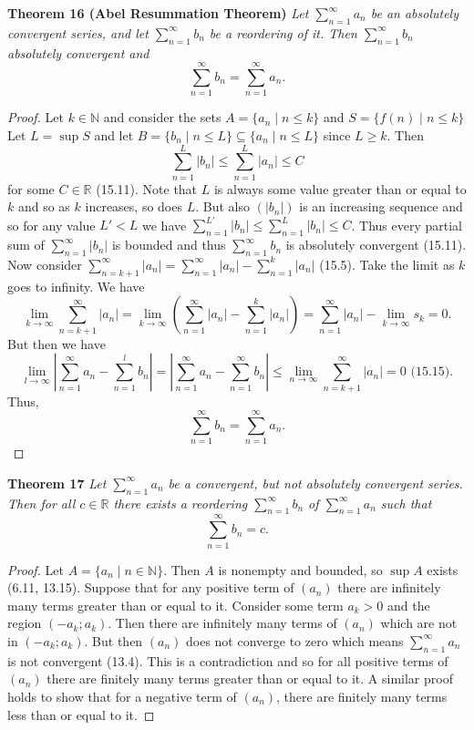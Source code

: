 \documentclass{article}
\begin{document}
\begin{flushleft}
\textbf{Theorem 16 (Abel Resummation Theorem)}
\textsl{Let $\sum_{n=1}^{\infty} a_n$ be an absolutely convergent series, and let $\sum_{n=1}^{\infty} b_n$ be a reordering of it. Then $\sum_{n=1}^{\infty} b_n$ absolutely convergent and
\[
\sum_{n=1}^{\infty} b_n = \sum_{n=1}^{\infty} a_n.
\]}
\begin{proof}
Let $k \in \mathbb{N}$ and consider the sets $A = \{a_n \mid n \leq k\}$ and $S = \{f(n) \mid n \leq k\}$ Let $L = \sup S$ and let $B = \{b_n \mid n \leq L\} \subseteq \{a_n \mid n \leq L\}$ since $L \geq k$. Then
\[
\sum_{n=1}^{L} |b_n| \leq \sum_{n=1}^{L} |a_n| \leq C
\]
for some $C \in \mathbb{R}$ (15.11). Note that $L$ is always some value greater than or equal to $k$ and so as $k$ increases, so does $L$. But also $(|b_n|)$ is an increasing sequence and so for any value $L' < L$ we have $\sum_{n=1}^{L'} |b_n| \leq \sum_{n=1}^L |b_n| \leq C$. Thus every partial sum of $\sum_{n=1}^{\infty} |b_n|$ is bounded and thus $\sum_{n=1}^{\infty} b_n$ is absolutely convergent (15.11). Now consider $\sum_{n=k+1}^{\infty} |a_n| = \sum_{n=1}^{\infty} |a_n| - \sum_{n=1}^{k} |a_n|$ (15.5). Take the limit as $k$ goes to infinity. We have
\[
\lim_{k \rightarrow \infty} \sum_{n=k+1}^{\infty} |a_n| = \lim_{k \rightarrow \infty} \left ( \sum_{n=1}^{\infty} |a_n| - \sum_{n=1}^{k} |a_n| \right ) = \sum_{n=1}^{\infty} |a_n| - \lim_{k \rightarrow \infty} s_k = 0.
\]
But then we have
\[
\lim_{l \rightarrow \infty} \left | \sum_{n=1}^{\infty} a_n - \sum_{n=1}^{l} b_n \right | = \left | \sum_{n=1}^{\infty} a_n - \sum_{n=1}^{\infty} b_n \right | \leq \lim_{n \rightarrow \infty} \sum_{n=k+1}^{\infty} |a_n| = 0 \text{ (15.15)}.
\]
Thus,
\[
\sum_{n=1}^{\infty} b_n = \sum_{n=1}^{\infty} a_n.
\]
\end{proof}

\textbf{Theorem 17}
\textsl{Let $\sum_{n=1}^{\infty} a_n$ be a convergent, but not absolutely convergent series. Then for all $c \in \mathbb{R}$ there exists a reordering $\sum_{n=1}^{\infty} b_n$ of $\sum_{n=1}^{\infty} a_n$ such that
\[
\sum_{n=1}^{\infty} b_n = c.
\]}
\begin{proof}
Let $A = \{a_n \mid n \in \mathbb{N}\}$. Then $A$ is nonempty and bounded, so $\sup A$ exists (6.11, 13.15). Suppose that for any positive term of $(a_n)$ there are infinitely many terms greater than or equal to it. Consider some term $a_k>0$ and the region $(-a_k ; a_k)$. Then there are infinitely many terms of $(a_n)$ which are not in $(-a_k ; a_k)$. But then $(a_n)$ does not converge to zero which means $\sum_{n=1}^{\infty} a_n$ is not convergent (13.4). This is a contradiction and so for all positive terms of $(a_n)$ there are finitely many terms greater than or equal to it. A similar proof holds to show that for a negative term of $(a_n)$, there are finitely many terms less than or equal to it.\newline


\end{proof}
\end{flushleft}
\end{document}
